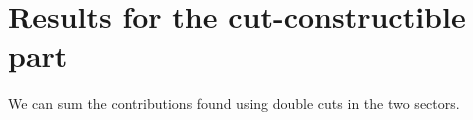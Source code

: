 \section{Results for the cut-constructible part}
We can sum the contributions found using double cuts in the two sectors.
